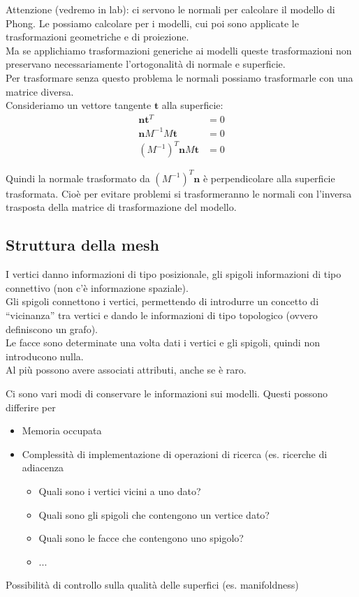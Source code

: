 \documentclass[a4paper, 10pt]{article}
\renewcommand{\vec}{\bm}
\begin{document}
		Attenzione (vedremo in lab): ci servono le normali per
		calcolare il modello di Phong. Le possiamo calcolare per i
		modelli, cui poi sono applicate le trasformazioni geometriche e
		di proiezione.\\
		Ma se applichiamo trasformazioni generiche ai modelli queste
		trasformazioni non preservano necessariamente l'ortogonalità
		di normale e superficie.\\
		Per trasformare senza questo problema le normali possiamo
		trasformarle con una matrice diversa.\\
		Consideriamo un vettore tangente $ \vec{t} $ alla superficie:
		\begin{align*}
			\vec{n}\vec{t}^T &= 0 \\
			\vec{n} M^{-1} M\vec{t} &= 0 \\
			(M^{-1})^T \vec{n} M\vec{t} &= 0
		\end{align*}
		
		Quindi la normale trasformato da $ (M^{-1})^T\vec{n} $ è perpendicolare alla
		superficie trasformata. Cioè per evitare problemi si
		trasformeranno le normali con l'inversa trasposta della matrice
		di trasformazione del modello.
		
	\subsection{Struttura della mesh}
		I vertici danno informazioni di tipo posizionale, gli spigoli
		informazioni di tipo connettivo (non c'è informazione spaziale).\\
		Gli spigoli connettono i vertici, permettendo di introdurre un
		concetto di “vicinanza” tra vertici e dando le informazioni di
		tipo topologico (ovvero definiscono un grafo).\\
		Le facce sono determinate una volta dati i vertici e gli spigoli,
		quindi non introducono nulla.\\
		Al più possono avere associati attributi, anche se è raro.\\
		
		\bigskip
		
		Ci sono vari modi di conservare le informazioni sui modelli.
		Questi possono differire per
		\begin{itemize}
			\item Memoria occupata
			\item Complessità di implementazione di operazioni di ricerca (es. ricerche
			di adiacenza
			\begin{itemize}
				\item Quali sono i vertici vicini a uno dato?
				\item Quali sono gli spigoli che contengono un vertice dato?
				\item Quali sono le facce che contengono uno spigolo?
				\item ...
			\end{itemize}
		\end{itemize}
		Possibilità di controllo sulla qualità delle superfici (es. manifoldness)
		
\end{document}
